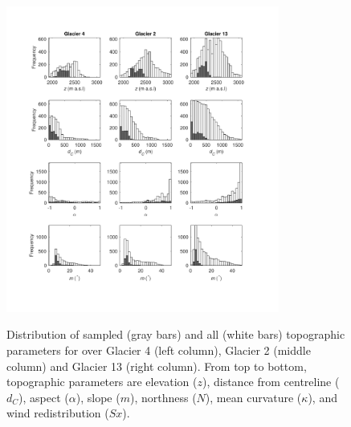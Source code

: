 \documentclass[twocolumn, letterpaper]{igs}
\begin{document}
\begin{figure}[]
	\centering
	\includegraphics[width =0.8\textwidth]{TopoParamsSampled1.pdf}\\
	\caption{Distribution of sampled (gray bars) and all (white bars) topographic parameters for over Glacier 4 (left column), Glacier 2 (middle column) and Glacier 13 (right column). From top to bottom, topographic parameters are elevation ($z$), distance from centreline ($d_C$), aspect ($\alpha$), slope ($m$), northness ($N$), mean curvature ($\kappa$), and wind redistribution ($Sx$).}
	\label{fig:TopoParamsSampled1}
\end{figure}

\renewcommand{\thefigure}{\arabic{figure} (Cont.)}
\addtocounter{figure}{-1}
\end{document}
